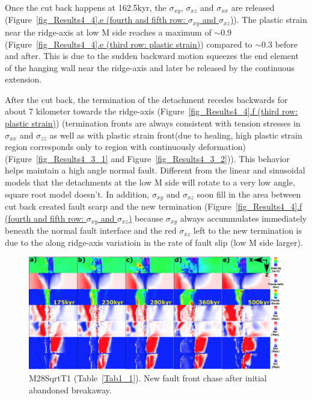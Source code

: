 Once the cut back happens at 162.5kyr, the $\sigma_{xy}$, $\sigma_{xz}$ and $\sigma_{xx}$ are released (Figure~\hyperref[fig_Results4_4]{\ref{fig_Results4_4}.e (fourth and fifth row: $\sigma_{xy}$ and $\sigma_{xz}$)}). The plastic strain near the ridge-axis at low M side reaches a maximum of $\sim$0.9 (Figure~\hyperref[fig_Results4_4]{\ref{fig_Results4_4}.e (third row: plastic strain)}) compared to $\sim$0.3 before and after. This is due to the sudden backward motion squeezes the end element of the hanging wall near the ridge-axis and later be released by the continuous extension.

After the cut back, the termination of the detachment recedes backwards for about 7 kilometer towards the ridge-axis (Figure~\hyperref[fig_Results4_4]{\ref{fig_Results4_4}.f (third row: plastic strain)}) (termination fronts are always consistent with tension stresses in $\sigma_{xx}$ and $\sigma_{zz}$ as well as with plastic strain front(due to healing, high plastic strain region corresponds only to region with continuously deformation) (Figure~\hyperref[fig_Results4_3_1]{\ref{fig_Results4_3_1}} and Figure~\hyperref[fig_Results4_3_2]{\ref{fig_Results4_3_2}})). This behavior helps maintain a high angle normal fault. Different from the linear and sinusoidal models that the detachments at the low M side will rotate to a very low angle, square root model doesn't. In addition, $\sigma_{xy}$ and $\sigma_{xz}$ soon fill in the area between cut back created fault scarp and the new termination (Figure~\hyperref[fig_Results4_4]{\ref{fig_Results4_4}.f (fourth and fifth row: $\sigma_{xy}$ and $\sigma_{xz}$)} because $\sigma_{xy}$ always accummulates immediately beneath the normal fault interface and the red $\sigma_{xz}$ left to the new termination is due to the along ridge-axis variatioin in the rate of fault slip (low M side larger).  

\begin{figure}[h]
  \centering
    \includegraphics[width=1.0\textwidth]{./Figures/fig_Results4_9_sqrt_cut_back_new_fault_chase.eps}
  \caption{M28SqrtT1 (Table~\hyperref[Tab1_1]{\ref{Tab1_1}}). New fault front chase after initial abandoned breakaway.}
 \label{fig_Results4_9}
\end{figure}

